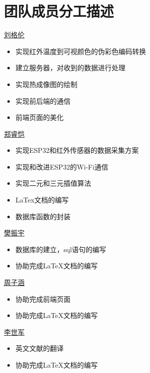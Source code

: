 
\chapter{团队成员分工描述}


\underline{刘格伦}
\begin{itemize}
    \item 实现红外温度到可视颜色的伪彩色编码转换
    \item 建立服务器，对收到的数据进行处理
    \item 实现热成像图的绘制
    \item 实现前后端的通信
    \item 前端页面的美化
    \end{itemize}

    \underline{郑睿恺}
\begin{itemize}
    \item 实现ESP32和红外传感器的数据采集方案
    \item 实现和改进ESP32的Wi-Fi通信
    \item 实现二元和三元插值算法
    \item LaTex文档的编写
    \item 数据库函数的封装
    \end{itemize}   

    \underline{樊振宇} 
\begin{itemize}
    \item 数据库的建立，sql语句的编写
    \item 协助完成LaTeX文档的编写
    \end{itemize}

    \underline{周子涵}    
\begin{itemize}
    \item 协助完成前端页面
    \item 协助完成LaTeX文档的编写
    \end{itemize}

    \underline{李世军}    
\begin{itemize}
    \item 英文文献的翻译
    \item 协助完成LaTeX文档的编写
    \end{itemize}
    
    
      







